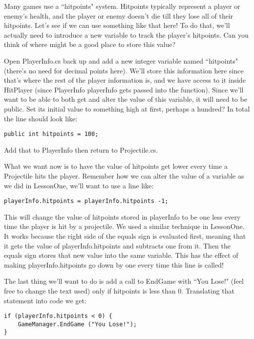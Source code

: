 \documentclass{article}
\begin{document}
Many games use a ``hitpoints" system. Hitpoints typically represent a player or enemy's health, and the player or enemy doesn't die till they lose all of their hitpoints. Let's see if we can use something like that here! To do that, we'll actually need to introduce a new variable to track the player's hitpoints. Can you think of where might be a good place to store this value? 

Open PlayerInfo.cs back up and add a new integer variable named ``hitpoints" (there's no need for decimal points here). We'll store this information here since that's where the rest of the player information is, and we have access to it inside HitPlayer (since PlayerInfo playerInfo gets passed into the function). Since we'll want to be able to both get and alter the value of this variable, it will need to be public. Set its initial value to something high at first, perhaps a hundred? In total the line should look like: 

\lstset{style=sharpc}
\begin{lstlisting}
public int hitpoints = 100;
\end{lstlisting}

Add that to PlayerInfo then return to Projectile.cs. 

What we want now is to have the value of hitpoints get lower every time a Projectile hits the player. Remember how we can alter the value of a variable as we did in LessonOne, we'll want to use a line like: 

\lstset{style=sharpc}
\begin{lstlisting}
playerInfo.hitpoints = playerInfo.hitpoints -1;
\end{lstlisting}

This will change the value of hitpoints stored in playerInfo to be one less every time the player is hit by a projectile. We used a similar technique in LessonOne. It works because the right side of the equals sign is evaluated first, meaning that it gets the value of playerInfo.hitpoints and subtracts one from it. Then the equals sign stores that new value into the same variable. This has the effect of making playerInfo.hitpoints go down by one every time this line is called! 

The last thing we'll want to do is add a call to EndGame with ``You Lose!" (feel free to change the text used) only if hitpoints is less than 0. Translating that statement into code we get: 

\lstset{style=sharpc}
\begin{lstlisting}
if (playerInfo.hitpoints < 0) {
	GameManager.EndGame ("You Lose!");
}
\end{lstlisting}
\end{document}
